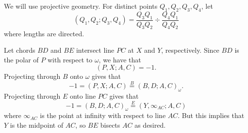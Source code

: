 We will use projective geometry. For distinct points $Q_1,Q_2,Q_3,Q_4$, let \[\left(Q_1,Q_2;Q_3,Q_4\right)=\frac{Q_3Q_1}{Q_3Q_2}\div\frac{Q_4Q_1}{Q_4Q_2}\] where lengths are directed.

Let chords $BD$ and $BE$ intersect line $PC$ at $X$ and $Y$, respectively. Since $BD$ is the polar of $P$ with respect to $\omega$, we have that \[\left(P,X;A,C\right)=-1.\] Projecting through $B$ onto $\omega$ gives that \[-1=\left(P,X;A,C\right)\stackrel{B}{=}\left(B,D;A,C\right)_{\omega}.\] Projecting through $E$ onto line $PC$ gives that \[-1=\left(B,D;A,C\right)_{\omega}\stackrel{E}{=}\left(Y,\infty_{AC};A,C\right)\] where $\infty_{AC}$ is the point at infinity with respect to line $AC$. But this implies that $Y$ is the midpoint of $AC$, so $BE$ bisects $AC$ as desired.